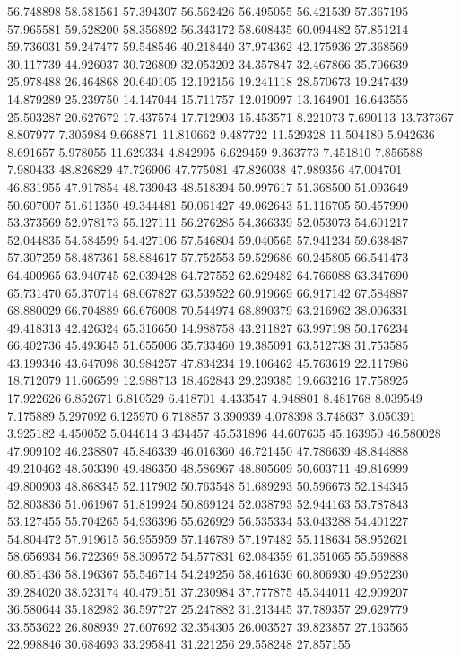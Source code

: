 56.748898
58.581561
57.394307
56.562426
56.495055
56.421539
57.367195
57.965581
59.528200
58.356892
56.343172
58.608435
60.094482
57.851214
59.736031
59.247477
59.548546
40.218440
37.974362
42.175936
27.368569
30.117739
44.926037
30.726809
32.053202
34.357847
32.467866
35.706639
25.978488
26.464868
20.640105
12.192156
19.241118
28.570673
19.247439
14.879289
25.239750
14.147044
15.711757
12.019097
13.164901
16.643555
25.503287
20.627672
17.437574
17.712903
15.453571
8.221073
7.690113
13.737367
8.807977
7.305984
9.668871
11.810662
9.487722
11.529328
11.504180
5.942636
8.691657
5.978055
11.629334
4.842995
6.629459
9.363773
7.451810
7.856588
7.980433
48.826829
47.726906
47.775081
47.826038
47.989356
47.004701
46.831955
47.917854
48.739043
48.518394
50.997617
51.368500
51.093649
50.607007
51.611350
49.344481
50.061427
49.062643
51.116705
50.457990
53.373569
52.978173
55.127111
56.276285
54.366339
52.053073
54.601217
52.044835
54.584599
54.427106
57.546804
59.040565
57.941234
59.638487
57.307259
58.487361
58.884617
57.752553
59.529686
60.245805
66.541473
64.400965
63.940745
62.039428
64.727552
62.629482
64.766088
63.347690
65.731470
65.370714
68.067827
63.539522
60.919669
66.917142
67.584887
68.880029
66.704889
66.676008
70.544974
68.890379
63.216962
38.006331
49.418313
42.426324
65.316650
14.988758
43.211827
63.997198
50.176234
66.402736
45.493645
51.655006
35.733460
19.385091
63.512738
31.753585
43.199346
43.647098
30.984257
47.834234
19.106462
45.763619
22.117986
18.712079
11.606599
12.988713
18.462843
29.239385
19.663216
17.758925
17.922626
6.852671
6.810529
6.418701
4.433547
4.948801
8.481768
8.039549
7.175889
5.297092
6.125970
6.718857
3.390939
4.078398
3.748637
3.050391
3.925182
4.450052
5.044614
3.434457
45.531896
44.607635
45.163950
46.580028
47.909102
46.238807
45.846339
46.016360
46.721450
47.786639
48.844888
49.210462
48.503390
49.486350
48.586967
48.805609
50.603711
49.816999
49.800903
48.868345
52.117902
50.763548
51.689293
50.596673
52.184345
52.803836
51.061967
51.819924
50.869124
52.038793
52.944163
53.787843
53.127455
55.704265
54.936396
55.626929
56.535334
53.043288
54.401227
54.804472
57.919615
56.955959
57.146789
57.197482
55.118634
58.952621
58.656934
56.722369
58.309572
54.577831
62.084359
61.351065
55.569888
60.851436
58.196367
55.546714
54.249256
58.461630
60.806930
49.952230
39.284020
38.523174
40.479151
37.230984
37.777875
45.344011
42.909207
36.580644
35.182982
36.597727
25.247882
31.213445
37.789357
29.629779
33.553622
26.808939
27.607692
32.354305
26.003527
39.823857
27.163565
22.998846
30.684693
33.295841
31.221256
29.558248
27.857155
